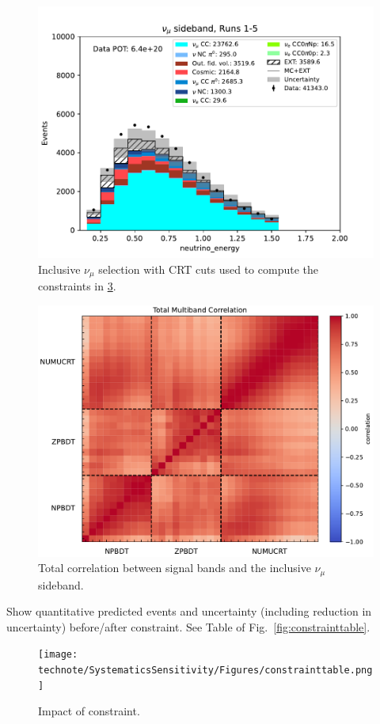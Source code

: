 \begin{figure}
    \centering
    \includegraphics[width=0.7\linewidth]{technote/SystematicsSensitivity/Figures/sideband_numu_runs_1-5.pdf}
    \caption{Inclusive $\nu_\mu$ selection with CRT cuts used to compute the constraints in \cref{fig:constraint}.}
    \label{fig:sideband-numu-crt}
\end{figure}

\begin{figure}
    \centering
    \includegraphics[width=0.7\linewidth]{technote/SystematicsSensitivity/Figures/multiband_correlation_runs_1-5_total.pdf}
    \caption{Total correlation between signal bands and the inclusive $\nu_\mu$ sideband.}
    \label{fig:correlation-genie}
\end{figure}

Show quantitative predicted events and uncertainty (including reduction in uncertainty) before/after constraint. See Table of Fig.~\ref{fig:constrainttable}.

\begin{center}
\begin{figure}
    \texttt{[image: technote/SystematicsSensitivity/Figures/constrainttable.png]}
    \caption{Impact of constraint.}
    \label{fig:constraint} 
\end{figure}
\end{center}

